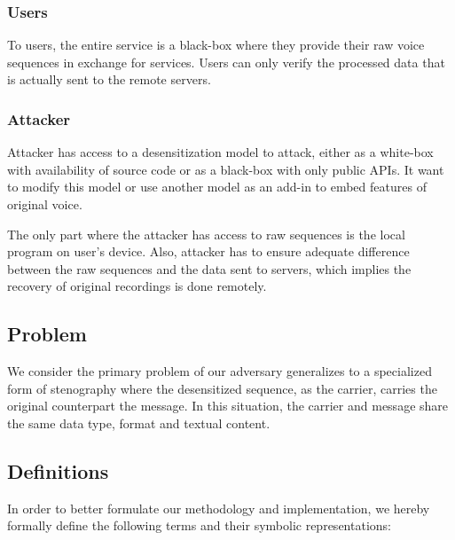 \documentclass[journal]{IEEEtran} %
\begin{document}
\subsubsection{Users}

To users, the entire service is a black-box where they provide their raw voice sequences in exchange for services. Users can only verify the processed data that is actually sent to the remote servers.

\subsubsection{Attacker}

Attacker has access to a desensitization model to attack, either as a white-box with availability of source code or as a black-box with only public APIs. It want to modify this model or use another model as an add-in to embed features of original voice.

The only part where the attacker has access to raw sequences is the local program on user's device. Also, attacker has to ensure adequate difference between the raw sequences and the data sent to servers, which implies the recovery of original recordings is done remotely.

\subsection{Problem}

We consider the primary problem of our adversary generalizes to a specialized form of stenography where the desensitized sequence, as the carrier, carries the original counterpart the message. In this situation, the carrier and message share the same data type, format and textual content.

\subsection{Definitions}

In order to better formulate our methodology and implementation, we hereby formally define the following terms and their symbolic representations:
\end{document}
